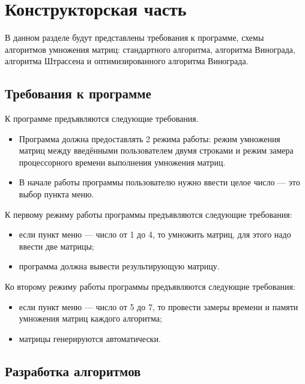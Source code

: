 \chapter{Конструкторская часть}

В данном разделе будут представлены требования к программе, схемы алгоритмов умножения матриц: стандартного алгоритма, алгоритма Винограда, алгоритма Штрассена и оптимизированного алгоритма Винограда.

\section{Требования к программе}
К программе предъявляются следующие требования.
\begin{itemize}
	\item Программа должна предоставлять 2 режима работы: режим умножения матриц между введёнными пользователем двумя строками и режим замера процессорного времени выполнения умножения матриц.
	\item В начале работы программы пользователю нужно ввести целое число --- это выбор пункта меню.
\end{itemize}

К первому режиму работы программы предъявляются следующие требования:
\begin{itemize}
	\item если пункт меню --- число от 1 до 4, то умножить матриц, для этого надо ввести две матрицы;
	\item программа должна вывести результирующую матрицу.
\end{itemize}

Ко второму режиму работы программы предъявляются следующие требования:
\begin{itemize}
	\item если пункт меню --- число от 5 до 7, то провести замеры времени и памяти умножения матриц каждого алгоритма;
	\item матрицы генерируются автоматически.
\end{itemize}

\section{Разработка алгоритмов}

